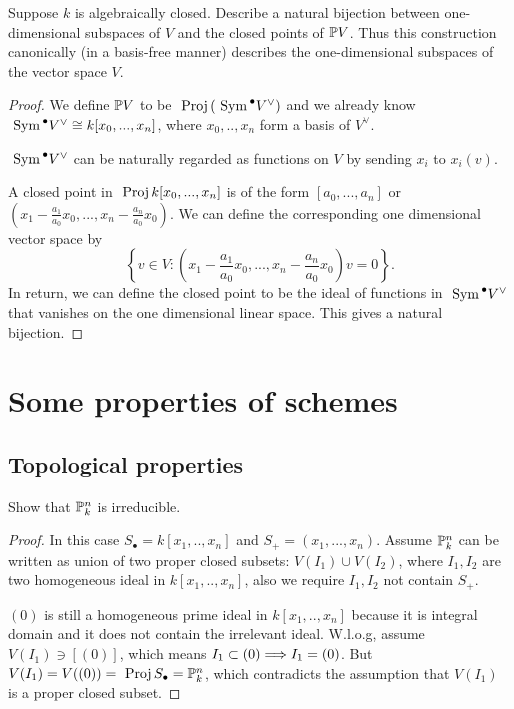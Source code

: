 \documentclass[11pt,fleqn]{book} %
\begin{document}
\begin{exr}
Suppose $k$ is algebraically closed. Describe a natural bijection between one-dimensional subspaces of $V$ and the closed points of $\mathbb P V$. Thus this construction canonically (in a basis-free manner) describes the one-dimensional subspaces of the vector space $V$.
\end{exr}
\begin{proof}
We define $\mathbb P V$ to be $\text{ Proj\,} (\text{ Sym\,}^\bullet V^\vee)$ and we already know $\text{ Sym\,}^\bullet V^\vee\cong k[x_0,...,x_n]$, where $x_0,..,x_n$ form a basis  of $V^\vee$.

$\text{ Sym\,}^\bullet V^\vee$ can be naturally regarded as functions on $V$ by sending $x_i$ to $x_i(v)$.

A closed point in $\text{ Proj\,} k[x_0,...,x_n]$ is of the form $[a_0,...,a_n]$ or $\left(x_1-\frac{a_1}{a_0}x_0,...,x_n-\frac{a_n}{a_0}x_0\right)$. We can define the corresponding one dimensional vector space by 
$$
\left\{v\in V: \left(x_1-\frac{a_1}{a_0}x_0,...,x_n-\frac{a_n}{a_0}x_0\right)v=0\right\}.
$$
In return, we can define the closed point to be the ideal of functions in $\text{ Sym\,}^\bullet V^\vee$ that vanishes on the one dimensional linear space.
This gives a natural bijection.
\end{proof}
\chapter{Some properties of schemes}
\section{Topological properties}
\begin{exr}
Show that $\mathbb P^n_k$ is irreducible.
\end{exr}
\begin{proof}
In this case $S_\bullet=k[x_1,..,x_n]$ and $S_+=(x_1,...,x_n)$.
Assume $\mathbb P^n_k$ can be written as union of two proper closed subsets: $V(I_1)\cup V(I_2)$, where $I_1,I_2$ are two homogeneous ideal in $k[x_1,..,x_n]$, also we require $I_1,I_2$ not contain $S_+$.

$(0)$ is still a homogeneous prime ideal in $k[x_1,..,x_n]$ because it is integral domain and it does not contain the irrelevant ideal. W.l.o.g, assume $V(I_1)\ni [(0)]$, which means $I_1\subset (0)\Longrightarrow I_1=(0)$. But $V(I_1)=V((0))=\text{ Proj\,} S_\bullet=\mathbb P^n_k$, which contradicts the assumption that $V(I_1)$ is a proper closed subset.
\end{proof}
\end{document}
